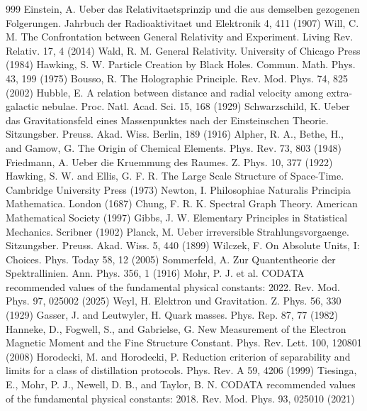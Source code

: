 \begin{thebibliography}{999}
 Einstein, A. Ueber das Relativitaetsprinzip und die aus demselben gezogenen Folgerungen. Jahrbuch der Radioaktivitaet und Elektronik 4, 411 (1907)
 Will, C. M. The Confrontation between General Relativity and Experiment. Living Rev. Relativ. 17, 4 (2014)
 Wald, R. M. General Relativity. University of Chicago Press (1984)
 Hawking, S. W. Particle Creation by Black Holes. Commun. Math. Phys. 43, 199 (1975)
 Bousso, R. The Holographic Principle. Rev. Mod. Phys. 74, 825 (2002)
 Hubble, E. A relation between distance and radial velocity among extra-galactic nebulae. Proc. Natl. Acad. Sci. 15, 168 (1929)
 Schwarzschild, K. Ueber das Gravitationsfeld eines Massenpunktes nach der Einsteinschen Theorie. Sitzungsber. Preuss. Akad. Wiss. Berlin, 189 (1916)
 Alpher, R. A., Bethe, H., and Gamow, G. The Origin of Chemical Elements. Phys. Rev. 73, 803 (1948)
 Friedmann, A. Ueber die Kruemmung des Raumes. Z. Phys. 10, 377 (1922)
 Hawking, S. W. and Ellis, G. F. R. The Large Scale Structure of Space-Time. Cambridge University Press (1973)
 Newton, I. Philosophiae Naturalis Principia Mathematica. London (1687)
 Chung, F. R. K. Spectral Graph Theory. American Mathematical Society (1997)
 Gibbs, J. W. Elementary Principles in Statistical Mechanics. Scribner (1902)
 Planck, M. Ueber irreversible Strahlungsvorgaenge. Sitzungsber. Preuss. Akad. Wiss. 5, 440 (1899)
 Wilczek, F. On Absolute Units, I: Choices. Phys. Today 58, 12 (2005)
 Sommerfeld, A. Zur Quantentheorie der Spektrallinien. Ann. Phys. 356, 1 (1916)
 Mohr, P. J. et al. CODATA recommended values of the fundamental physical constants: 2022. Rev. Mod. Phys. 97, 025002 (2025)
 Weyl, H. Elektron und Gravitation. Z. Phys. 56, 330 (1929)
 Gasser, J. and Leutwyler, H. Quark masses. Phys. Rep. 87, 77 (1982)
 Hanneke, D., Fogwell, S., and Gabrielse, G. New Measurement of the Electron Magnetic Moment and the Fine Structure Constant. Phys. Rev. Lett. 100, 120801 (2008)
 Horodecki, M. and Horodecki, P. Reduction criterion of separability and limits for a class of distillation protocols. Phys. Rev. A 59, 4206 (1999)
 Tiesinga, E., Mohr, P. J., Newell, D. B., and Taylor, B. N. CODATA recommended values of the fundamental physical constants: 2018. Rev. Mod. Phys. 93, 025010 (2021)

\end{thebibliography}
